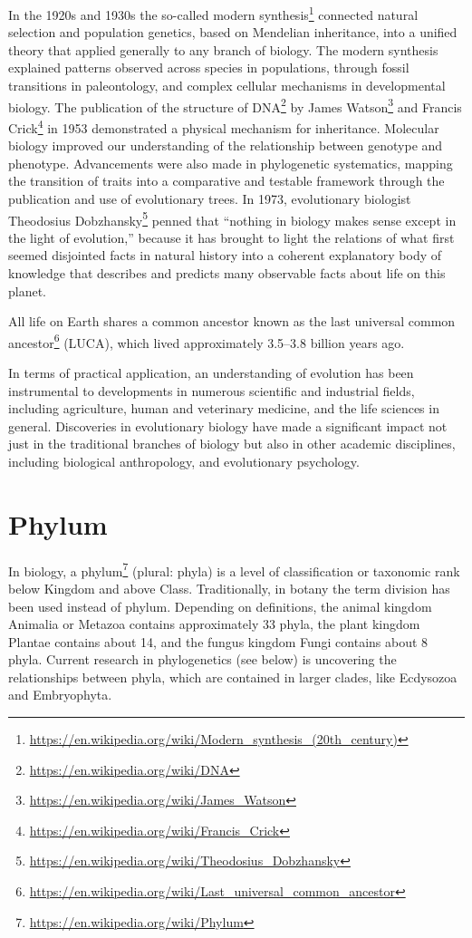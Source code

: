 \documentclass[]{book}
\let\rmarkdownfootnote\footnote%
\def\footnote{\protect\rmarkdownfootnote}
\renewcommand{\href}[2]{#2\footnote{\url{#1}}}
\theoremstyle{definition}
\theoremstyle{definition}
\theoremstyle{definition}
\theoremstyle{remark}
\begin{document}
In the 1920s and 1930s the so-called
\href{https://en.wikipedia.org/wiki/Modern_synthesis_(20th_century)}{modern
synthesis} connected natural selection and population genetics, based on
Mendelian inheritance, into a unified theory that applied generally to
any branch of biology. The modern synthesis explained patterns observed
across species in populations, through fossil transitions in
paleontology, and complex cellular mechanisms in developmental biology.
The publication of the structure of
\href{https://en.wikipedia.org/wiki/DNA}{DNA} by
\href{https://en.wikipedia.org/wiki/James_Watson}{James Watson} and
\href{https://en.wikipedia.org/wiki/Francis_Crick}{Francis Crick} in
1953 demonstrated a physical mechanism for inheritance. Molecular
biology improved our understanding of the relationship between genotype
and phenotype. Advancements were also made in phylogenetic systematics,
mapping the transition of traits into a comparative and testable
framework through the publication and use of evolutionary trees. In
1973, evolutionary biologist
\href{https://en.wikipedia.org/wiki/Theodosius_Dobzhansky}{Theodosius
Dobzhansky} penned that ``nothing in biology makes sense except in the
light of evolution,'' because it has brought to light the relations of
what first seemed disjointed facts in natural history into a coherent
explanatory body of knowledge that describes and predicts many
observable facts about life on this planet.

All life on Earth shares a common ancestor known as the
\href{https://en.wikipedia.org/wiki/Last_universal_common_ancestor}{last
universal common ancestor} (LUCA), which lived approximately 3.5--3.8
billion years ago.

In terms of practical application, an understanding of evolution has
been instrumental to developments in numerous scientific and industrial
fields, including agriculture, human and veterinary medicine, and the
life sciences in general. Discoveries in evolutionary biology have made
a significant impact not just in the traditional branches of biology but
also in other academic disciplines, including biological anthropology,
and evolutionary psychology.

\section{Phylum}\label{phylum}

In biology, a \href{https://en.wikipedia.org/wiki/Phylum}{phylum}
(plural: phyla) is a level of classification or taxonomic rank below
Kingdom and above Class. Traditionally, in botany the term division has
been used instead of phylum. Depending on definitions, the animal
kingdom Animalia or Metazoa contains approximately 33 phyla, the plant
kingdom Plantae contains about 14, and the fungus kingdom Fungi contains
about 8 phyla. Current research in phylogenetics (see below) is
uncovering the relationships between phyla, which are contained in
larger clades, like Ecdysozoa and Embryophyta.
\end{document}
